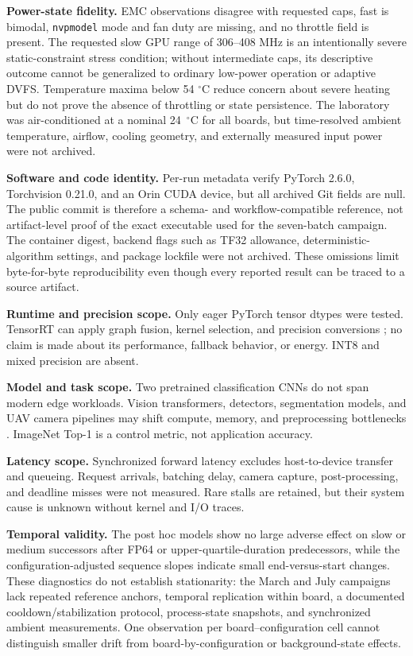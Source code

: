 \documentclass[electronics,article,submit,pdftex,moreauthors]{Definitions/mdpi}
\begin{document}
\textbf{Power-state fidelity.} EMC observations disagree with requested caps, fast is bimodal, \texttt{nvpmodel} mode and fan duty are missing, and no throttle field is present. The requested slow GPU range of 306--408 MHz is an intentionally severe static-constraint stress condition; without intermediate caps, its descriptive outcome cannot be generalized to ordinary low-power operation or adaptive DVFS. Temperature maxima below 54 $^\circ$C reduce concern about severe heating but do not prove the absence of throttling or state persistence. The laboratory was air-conditioned at a nominal 24~$^\circ$C for all boards, but time-resolved ambient temperature, airflow, cooling geometry, and externally measured input power were not archived.

\textbf{Software and code identity.} Per-run metadata verify PyTorch 2.6.0, Torchvision 0.21.0, and an Orin CUDA device, but all archived Git fields are null. The public commit is therefore a schema- and workflow-compatible reference, not artifact-level proof of the exact executable used for the seven-batch campaign. The container digest, backend flags such as TF32 allowance, deterministic-algorithm settings, and package lockfile were not archived. These omissions limit byte-for-byte reproducibility even though every reported result can be traced to a source artifact.

\textbf{Runtime and precision scope.} Only eager PyTorch tensor dtypes were tested. TensorRT can apply graph fusion, kernel selection, and precision conversions \cite{jeong2022tensorrt,nvidiatensorrt}; no claim is made about its performance, fallback behavior, or energy. INT8 and mixed precision are absent.

\textbf{Model and task scope.} Two pretrained classification CNNs do not span modern edge workloads. Vision transformers, detectors, segmentation models, and UAV camera pipelines may shift compute, memory, and preprocessing bottlenecks \cite{rey2025drone}. ImageNet Top-1 is a control metric, not application accuracy.

\textbf{Latency scope.} Synchronized forward latency excludes host-to-device transfer and queueing. Request arrivals, batching delay, camera capture, post-processing, and deadline misses were not measured. Rare stalls are retained, but their system cause is unknown without kernel and I/O traces.

\textbf{Temporal validity.} The post hoc models show no large adverse effect on slow or medium successors after FP64 or upper-quartile-duration predecessors, while the configuration-adjusted sequence slopes indicate small end-versus-start changes. These diagnostics do not establish stationarity: the March and July campaigns lack repeated reference anchors, temporal replication within board, a documented cooldown/stabilization protocol, process-state snapshots, and synchronized ambient measurements. One observation per board--configuration cell cannot distinguish smaller drift from board-by-configuration or background-state effects.
\end{document}
